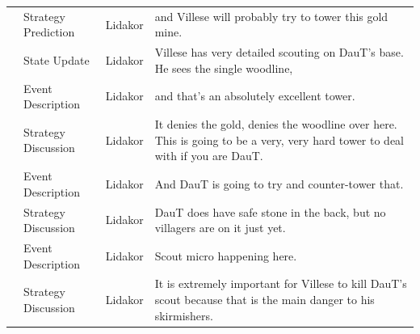 {\begin{longtable}{@{}>{\theAppRow}r|L{2.3cm}L{1.0cm}U{11.55cm}@{}}
    & Strategy Prediction   & Lidakor & and Villese will probably try to tower this gold mine.                                                                                                                                                                                                                                          \\
    & State Update          & Lidakor & Villese has very detailed scouting on DauT's base. He sees the single woodline,                                                                                                                                                                                                                 \\
    & Event Description     & Lidakor & and that's an absolutely excellent tower.                                                                                                                                                                                                                                                       \\
    & Strategy Discussion   & Lidakor & It denies the gold, denies the woodline over here. This is going to be a very, very hard tower to deal with if you are DauT.                                                                                                                                                                    \\
    & Event Description     & Lidakor & And DauT is going to try and counter-tower that.                                                                                                                                                                                                                                                \\
    & Strategy Discussion   & Lidakor & DauT does have safe stone in the back, but no villagers are on it just yet.                                                                                                                                                                                                                     \\
    & Event Description     & Lidakor & Scout micro happening here.                                                                                                                                                                                                                                                                     \\
    & Strategy Discussion   & Lidakor & It is extremely important for Villese to kill DauT's scout because that is the main danger to his skirmishers.                                                                                                                                                                                  \\

\end{longtable}}
